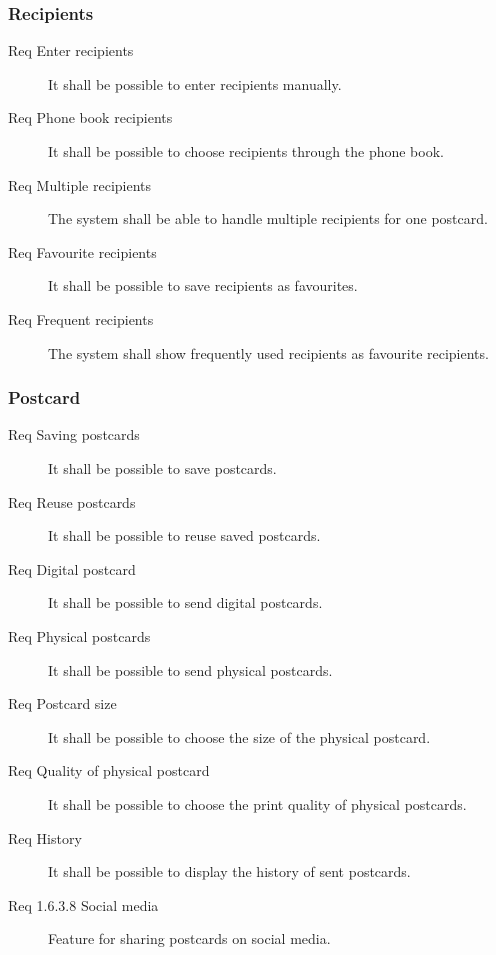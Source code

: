 \documentclass[10pt,a4paper]{article}
\begin{document}
\subsubsection{Recipients}
\begin{description}
\item [Req  Enter recipients] It shall be possible to enter recipients manually.
\item [Req  Phone book recipients] It shall be possible to choose recipients through the phone book.
\item [Req  Multiple recipients] The system shall be able to handle multiple recipients for one postcard.
\item [Req  Favourite recipients] It shall be possible to save recipients as favourites.
\item [Req  Frequent recipients] The system shall show frequently used recipients as favourite recipients.
\end{description}

\subsubsection{Postcard}
\begin{description}
\item [Req  Saving postcards] It shall be possible to save postcards.
\item [Req  Reuse postcards] It shall be possible to reuse saved postcards.
\item [Req  Digital postcard] It shall be possible to send digital postcards.
\item [Req  Physical postcards] It shall be possible to send physical postcards.
\item [Req  Postcard size] It shall be possible to choose the size of the physical postcard.
\item [Req  Quality of physical postcard] It shall be possible to choose the print quality of physical postcards. 
\item [Req  History] It shall be possible to display the history of sent postcards.

\item [Req 1.6.3.8 Social media] Feature for sharing postcards on social media.
\end {description}
\end{document}

